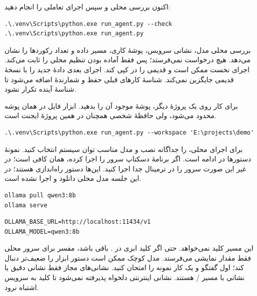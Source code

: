 اکنون بررسی محلی و سپس اجرای تعاملی را انجام دهید:

\begin{LTR}
\begin{Verbatim}[breaklines,breakanywhere,fontsize=\small]
.\.venv\Scripts\python.exe run_agent.py --check
.\.venv\Scripts\python.exe run_agent.py
\end{Verbatim}
\end{LTR}

بررسی محلی مدل، نشانی سرویس، پوشهٔ کاری، مسیر داده و تعداد رکوردها را نشان می‌دهد. هیچ درخواست 
 نمی‌فرستد؛ پس فقط آماده بودن تنظیم محلی را ثابت می‌کند. اجرای نخست ممکن است 
 و 
 قدیمی را در 
 کپی کند. اجرای بعدی دادهٔ جدید را با نسخهٔ قدیمی جایگزین نمی‌کند. شناسهٔ کارهای قبلی حفظ و شمارندهٔ 
 اضافه می‌شود تا شناسهٔ آینده تکرار نشود.

برای کار روی یک پروژهٔ دیگر، پوشهٔ موجود آن را بدهید. ابزار فایل در همان پوشه محدود می‌شود، ولی حافظهٔ شخصی همچنان در 
 همین پروژهٔ ایجنت است.

\begin{LTR}
\begin{Verbatim}[breaklines,breakanywhere,fontsize=\small]
.\.venv\Scripts\python.exe run_agent.py --workspace 'E:\projects\demo'
\end{Verbatim}
\end{LTR}

برای اجرای محلی، 
 را جداگانه نصب و مدل مناسب توان سیستم انتخاب کنید. نمونهٔ دستورها در ادامه است. اگر برنامهٔ دسکتاپ 
 سرور را اجرا کرده، همان کافی است؛ در غیر این صورت سرور را در ترمینال جدا اجرا کنید. این‌ها دستور راه‌اندازی هستند؛ در این جلسه مدل محلی دانلود و اجرا نشده است.

\begin{LTR}
\begin{Verbatim}[breaklines,breakanywhere,fontsize=\small]
ollama pull qwen3:8b
ollama serve
\end{Verbatim}
\end{LTR}

\begin{LTR}
\begin{Verbatim}[breaklines,breakanywhere,fontsize=\small]
OLLAMA_BASE_URL=http://localhost:11434/v1
OLLAMA_MODEL=qwen3:8b
\end{Verbatim}
\end{LTR}

این مسیر کلید 
 نمی‌خواهد. حتی اگر کلید ابری در .
 باقی باشد، مفسر برای سرور محلی فقط مقدار نمایشی 
 می‌فرستد. مدل کوچک ممکن است دستور ابزار را ضعیف‌تر دنبال کند؛ اول گفتگو و یک کار نمونه را امتحان کنید. نشانی‌های مجاز 
 فقط نشانی دقیق 
 یا نشانی 
 با مسیر /
 هستند. نشانی اینترنتی دلخواه پذیرفته نمی‌شود تا کلید به سرویس اشتباه نرود.

\cite{ollama-api,ollama-pricing}
